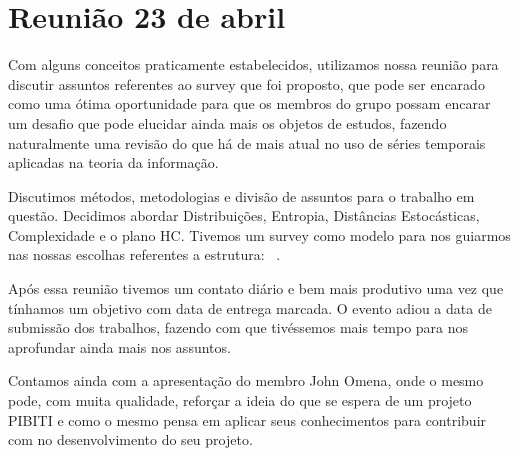 \documentclass[a4paper]{article}
\begin{document}
\section{Reunião 23 de abril}

Com alguns conceitos praticamente estabelecidos, utilizamos nossa reunião para discutir assuntos referentes ao survey que foi proposto, que pode ser encarado como uma ótima oportunidade para que os membros do grupo possam encarar um desafio que pode elucidar ainda mais os objetos de estudos, fazendo naturalmente uma revisão do que há de mais atual no uso de séries temporais aplicadas na teoria da informação. 

Discutimos métodos, metodologias e divisão de assuntos para o trabalho em questão. Decidimos abordar Distribuições, Entropia, Distâncias Estocásticas, Complexidade e o plano HC. Tivemos um survey como modelo para nos guiarmos nas nossas escolhas referentes a estrutura: ~\cite{survey}.

Após essa reunião tivemos um contato diário e bem mais produtivo uma vez que tínhamos um objetivo com data de entrega marcada. O evento adiou a data de submissão dos trabalhos, fazendo com que tivéssemos mais tempo para nos aprofundar ainda mais nos assuntos. 

Contamos ainda com a apresentação do membro John Omena, onde o mesmo pode, com muita qualidade, reforçar a ideia do que se espera de um projeto PIBITI e como o mesmo pensa em aplicar seus conhecimentos para contribuir com no desenvolvimento do seu projeto.



\end{document}
